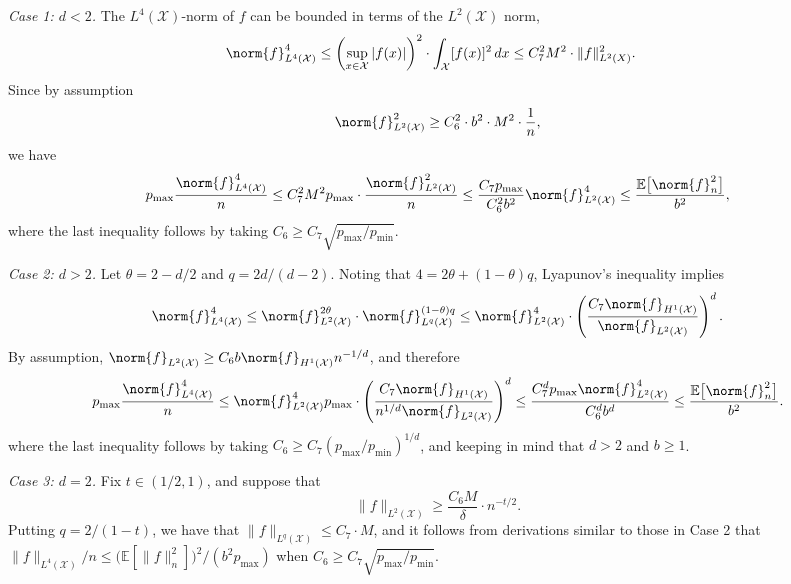 \documentclass[twoside]{article}
\newcommand{\abs}[1]{\left \lvert #1 \right \rvert}
\newcommand{\1}{\mathbf{1}}
\newcommand{\Xset}{\mathcal{X}}
\newcommand{\Leb}{L}
\newcommand{\mc}[1]{\mathcal{#1}}
\newcommand{\Ebb}{\mathbb{E}}
\theoremstyle{definition}
\theoremstyle{remark}
\begin{document}
\textit{Case 1: $d < 2$.}
The $\Leb^4(\Xset)$-norm of $f$ can be bounded in terms of the $\Leb^2(\Xset)$ norm,
\begin{align*}
\norm{f}_{\Leb^4(\Xset)}^4 & \leq \left(\sup_{x \in \Xset} \abs{f(x)}\right)^2 \cdot \int_{\Xset} [f(x)]^2 \,dx \leq C_7^2 M^2 \cdot \|f\|_{\Leb^2(X)}^2.
\end{align*}
Since by assumption
\begin{equation*}
\norm{f}_{\Leb^2(\Xset)}^2 \geq C_6^2 \cdot b^2 \cdot M^2 \cdot \frac{1}{n},
\end{equation*}
we have
\begin{equation*}
p_{\max} \frac{\norm{f}_{\Leb^4(\Xset)}^4}{n} \leq C_7^2 M^2p_{\max} \cdot \frac{\norm{f}_{\Leb^2(\Xset)}^2}{n} \leq \frac{C_7p_{\max}}{C_6^2 b^2} \norm{f}_{\Leb^2(\Xset)}^4 \leq \frac{\Ebb\bigl[\norm{f}_n^2\bigr]}{b^2},
\end{equation*}
where the last inequality follows by taking $C_6 \geq C_7 \sqrt{p_{\max}/p_{\min}}$.

\textit{Case 2: $d > 2$.}
Let $\theta = 2 - d/2$ and $q = 2d/(d - 2)$. Noting that $4 = 2\theta + (1 - \theta)q$, Lyapunov's inequality implies
\begin{equation*}
\norm{f}_{\Leb^4(\Xset)}^4 \leq \norm{f}_{\Leb^2(\Xset)}^{2\theta} \cdot \norm{f}_{\Leb^q(\Xset)}^{(1 - \theta)q} \leq \norm{f}_{\Leb^2(\Xset)}^{4} \cdot \left(\frac{C_7\norm{f}_{H^1(\Xset)}}{\norm{f}_{\Leb^2(\Xset)}}\right)^{d}.
\end{equation*}
By assumption, $\norm{f}_{\Leb^2(\Xset)} \geq C_6 b \norm{f}_{H^1(\Xset)} n^{-1/d}$, and therefore
\begin{equation*}
p_{\max} \frac{\norm{f}_{\Leb^4(\Xset)}^4}{n} \leq \norm{f}_{\Leb^2(\Xset)}^4p_{\max} \cdot \left(\frac{C_7\norm{f}_{H^1(\Xset)}}{n^{1/d}\norm{f}_{\Leb^2(\Xset)}}\right)^{d} \leq \frac{C_7^dp_{\max}\norm{f}_{\Leb^2(\Xset)}^4}{C_6^db^{d}} \leq \frac{\Ebb\bigl[\norm{f}_n^2\bigr]}{b^2}.
\end{equation*}
where the last inequality follows by taking $C_6 \geq C_7(p_{\max}/p_{\min})^{1/d}$, and keeping in mind that $d > 2$ and $b \geq 1$. 

\textit{Case 3: $d = 2$.}
Fix $t \in (1/2,1)$, and suppose that
\begin{equation}
\label{pf:empirical_norm_sobolev_1}
\|f\|_{\Leb^2(\Xset)} \geq \frac{C_6 M}{\delta} \cdot n^{-t/2}.
\end{equation} 
Putting $q = 2/(1 - t)$, we have that $\|f\|_{\Leb^{q}(\mc{X})} \leq C_7 \cdot M$, and it follows from derivations similar to those in Case 2 that $\|f\|_{\Leb^4(\Xset)}/n \leq \bigl(\mathbb{E}[\|f\|_n^2]\bigr)^2/(b^2p_{\max})$ when $C_6 \geq C_7 \sqrt{p_{\max}/p_{\min}}$.
\end{document}
